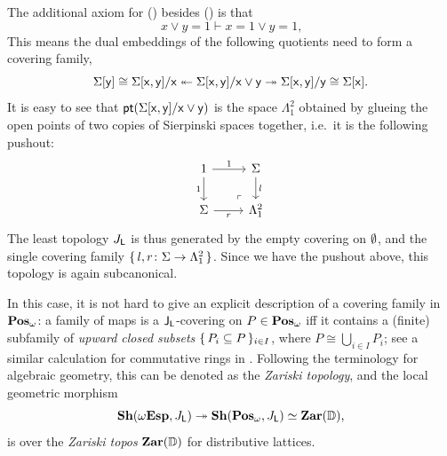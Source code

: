 \begin{example}[\AxiomL]
  The additional axiom for (\AxiomL) besides (\AxiomNT) is that 
  \[ x \vee y = 1 \vdash x = 1 \vee y = 1\text{,} \] 
  This means the dual embeddings of the following quotients need to form a covering family,
  \[ \Sigma[\mathsf{y}] \cong \Sigma[\mathsf{x},\mathsf{y}]/\mathsf{x} \twoheadleftarrow \Sigma[\mathsf{x},\mathsf{y}]/\mathsf{x}\vee \mathsf{y} \twoheadrightarrow \Sigma[\mathsf{x},\mathsf{y}]/\mathsf{y} \cong \Sigma[\mathsf{x}]\text{.} \]
  It is easy to see that $\mathsf{pt}(\Sigma[\mathsf{x},\mathsf{y}]/\mathsf{x} \vee \mathsf{y})$ is the space $\Lambda^2_1$ obtained by glueing the open points of two copies of Sierpinski spaces together, i.e.\ it is the following pushout:
  \[
  \begin{tikzcd}
    1 \ar[d, "1"'] \ar[r, "1"] & \Sigma \ar[d, "l"] \\ 
    \Sigma \ar[r, "r"'] & \Lambda^2_1
    \arrow["\lrcorner"{anchor=center, pos=0.125, rotate=180}, draw=none, from=2-2, to=1-1]    
  \end{tikzcd}
  \]
  The least topology $J_{\mathsf{L}}$ is thus generated by the empty covering on $\emptyset$, and the single covering family $\{\,l,r \colon \Sigma \to \Lambda^2_1\,\}$. Since we have the pushout above, this topology is again subcanonical. 
  
  In this case, it is not hard to give an explicit description of a covering family in $\mathbf{Pos}_\omega$: a family of maps is a $\mathsf{J}_{\mathsf{L}}$-covering on $P \in \mathbf{Pos}_\omega$ iff it contains a (finite) subfamily of \emph{upward closed subsets} $\{\,P_i\subseteq P\,\}_{i\in I}$, where $P \cong \bigcup_{i\in I}P_i$; see a similar calculation for commutative rings in \citet[VIII. 6]{maclane1992sheaves}. Following the terminology for algebraic geometry, this can be denoted as the \emph{Zariski topology}, and the local geometric morphism
  \[ \mathbf{Sh}(\omega\mathbf{Esp},J_{\mathsf{L}}) \twoheadrightarrow \mathbf{Sh}(\mathbf{Pos}_\omega,J_{\mathsf{L}}) \simeq \mathbf{Zar}(\mathbb{D})\text{,} \]
  is over the \emph{Zariski topos} $\mathbf{Zar}(\mathbb{D})$ for distributive lattices.
\end{example}


